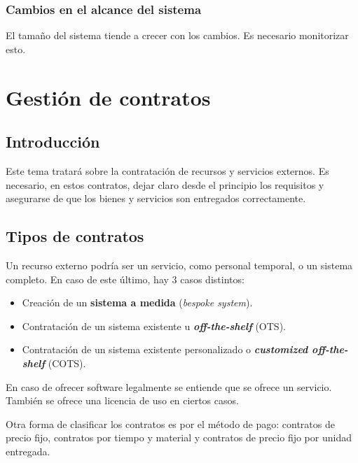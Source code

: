 \documentclass[12pt]{article}
\begin{document}
\subsubsection{Cambios en el alcance del sistema}
\label{9.9.3}

{El tamaño del sistema tiende a crecer con los cambios. Es necesario monitorizar esto.}

\newpage
\section{Gestión de contratos}
\label{10.0.0}

\subsection{Introducción}
\label{10.1.0}

{Este tema tratará sobre la contratación de recursos y servicios externos. Es necesario, en estos contratos, dejar claro desde el principio los requisitos y asegurarse de que los bienes y servicios son entregados correctamente.}

\subsection{Tipos de contratos}
\label{10.2.0}

{Un recurso externo podría ser un servicio, como personal temporal, o un sistema completo. En caso de este último, hay 3 casos distintos:}

\begin{itemize}
    \item {Creación de un \textbf{sistema a medida} (\textit{bespoke system}).}
    \item {Contratación de un sistema existente u \textbf{\textit{off-the-shelf}} (OTS).}
    \item {Contratación de un sistema existente personalizado o \textbf{\textit{customized off-the-shelf}} (COTS).}
\end{itemize}

{En caso de ofrecer software legalmente se entiende que se ofrece un servicio. También se ofrece una licencia de uso en ciertos casos.} \bigskip

{Otra forma de clasificar los contratos es por el método de pago: contratos de precio fijo, contratos por tiempo y material y contratos de precio fijo por unidad entregada.}
\end{document}

